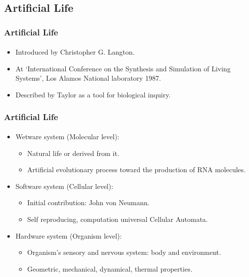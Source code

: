 \subsection{Artificial Life}

\frame
{
	\frametitle{Artificial Life}
	\framesubtitle{}

	\begin{itemize}
		\item Introduced by Christopher G. Langton.
		\item At `International Conference on the Synthesis and Simulation of Living Systems', Los Alamos National laboratory 1987.
		\item Described by Taylor as a tool for biological inquiry.
	\end{itemize}
}

\frame
{
	\frametitle{Artificial Life}
	\framesubtitle{}

	\begin{itemize}
		\item Wetware system (Molecular level):
			\begin{itemize}
				\item Natural life or derived from it.
				\item Artificial evolutionary process toward the production of RNA molecules.
			\end{itemize}
		\item Software system (Cellular level):
			\begin{itemize}
				\item Initial contribution: John von Neumann.
				\item Self reproducing, computation universal Cellular Automata.
			\end{itemize}
		\item Hardware system (Organism level):
			\begin{itemize}
				\item Organism's sensory and nervous system: body and environment.
				\item Geometric, mechanical, dynamical, thermal properties.
			\end{itemize}
	\end{itemize}
}

